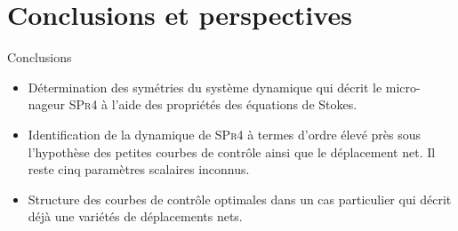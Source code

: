 \documentclass[10pt, envcountsect]{beamer}
\theoremstyle{plain}
\newcommand{\N}{\mathbb{N}}
\newcommand{\R}{\mathbb{R}}
\begin{document}
%
%
%

\section{Conclusions et perspectives}

\begin{frame}{Conclusions}
\begin{itemize}
\item Détermination des symétries du système dynamique qui décrit le micro-nageur \textsc{SPr4} à l'aide des propriétés des équations de Stokes.

\item Identification de la dynamique de \textsc{SPr4} à termes d'ordre élevé près sous l'hypothèse des petites courbes de contrôle ainsi que le déplacement net. Il reste cinq paramètres scalaires inconnus.

\item Structure des courbes de contrôle optimales dans un cas particulier qui décrit déjà une variétés de déplacements nets.
\end{itemize}

\end{frame}
\end{document}
